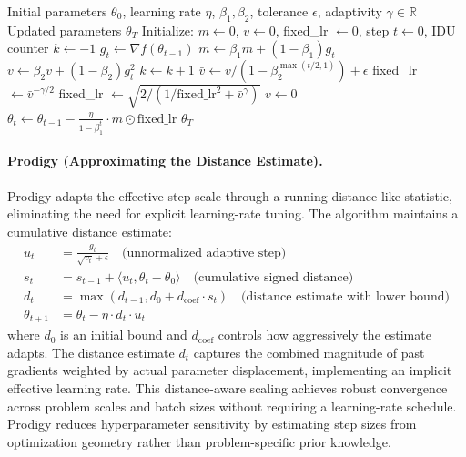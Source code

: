 \begin{algorithm}[H]
\caption{Anon (Adaptivity Non-restricted Optimizer with IDU)}
\label{alg:anon}
\begin{algorithmic}[1]
\Require Initial parameters $\theta_0$, learning rate $\eta$, $\beta_1, \beta_2$, tolerance $\epsilon$, adaptivity $\gamma \in \mathbb{R}$
\Ensure Updated parameters $\theta_T$
\State Initialize: $m \gets 0$, $v \gets 0$, fixed\_lr $\gets 0$, step $t \gets 0$, IDU counter $k \gets -1$
    \State $g_t \gets \nabla f(\theta_{t-1})$
    \State $m \gets \beta_1 m + (1-\beta_1) g_t$
    \State $v \gets \beta_2 v + (1-\beta_2) g_t^2$
        \State $k \gets k+1$
        \State $\bar{v} \gets v/(1 - \beta_2^{\max(t/2,1)}) + \epsilon$
            \State fixed\_lr $\gets \bar{v}^{-\gamma/2}$
        \Else
            \State fixed\_lr $\gets \sqrt{2 / (1/\text{fixed\_lr}^2 + \bar{v}^\gamma)}$
        \EndIf
        \State $v \gets 0$
    \EndIf
    \State $\theta_t \gets \theta_{t-1} - \frac{\eta}{1-\beta_1^t} \cdot m \odot \text{fixed\_lr}$
\EndFor
\Return $\theta_T$
\end{algorithmic}
\end{algorithm}

\paragraph{Prodigy (Approximating the Distance Estimate).}
Prodigy adapts the effective step scale through a running distance-like statistic, eliminating the need for explicit learning-rate tuning. The algorithm maintains a cumulative distance estimate:
\begin{align}
u_t &= \frac{g_t}{\sqrt{v_t}+\epsilon} \quad\text{(unnormalized adaptive step)} \\
s_t &= s_{t-1} + \langle u_t, \theta_t - \theta_0 \rangle \quad\text{(cumulative signed distance)} \\
d_t &= \max(d_{t-1}, d_0 + d_{\text{coef}} \cdot s_t) \quad\text{(distance estimate with lower bound)} \\
\theta_{t+1} &= \theta_t - \eta \cdot d_t \cdot u_t
\end{align}
where $d_0$ is an initial bound and $d_{\text{coef}}$ controls how aggressively the estimate adapts. The distance estimate $d_t$ captures the combined magnitude of past gradients weighted by actual parameter displacement, implementing an implicit effective learning rate. This distance-aware scaling achieves robust convergence across problem scales and batch sizes without requiring a learning-rate schedule. Prodigy reduces hyperparameter sensitivity by estimating step sizes from optimization geometry rather than problem-specific prior knowledge.

